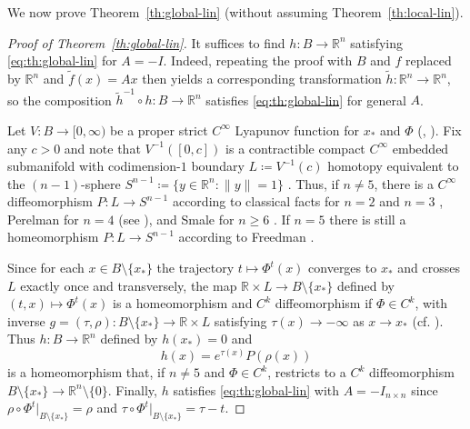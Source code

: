 \documentclass[11pt]{amsart}
\newcommand{\R}{\mathbb{R}}
\theoremstyle{definition}
\begin{document}
We now prove Theorem~\ref{th:global-lin} (without assuming Theorem~\ref{th:local-lin}).

\begin{proof}[Proof of Theorem~\ref{th:global-lin}]
It suffices to find $h\colon B\to \R^n$ satisfying \eqref{eq:th:global-lin} for $A=-I$.
Indeed, repeating the proof with $B$ and $f$ replaced by $\R^n$ and $\tilde{f}(x)=Ax$ then yields a corresponding transformation $\tilde{h}\colon \R^n\to \R^n$, so the composition $\tilde{h}^{-1}\circ h\colon B\to \R^n$  satisfies \eqref{eq:th:global-lin} for general $A$.

Let  $V\colon B\to [0,\infty)$ be a proper strict $C^\infty$ Lyapunov function for $x_*$ and $\Phi$ (\cite[Thm~3.2]{wilson1969smooth}, \cite[Sec.~6]{fathi2019smoothing}).
Fix any $c>0$ and note that $V^{-1}([0,c])$ is a contractible compact $C^\infty$ embedded submanifold with codimension-$1$ boundary $L\coloneqq V^{-1}(c)$ homotopy equivalent to the $(n-1)$-sphere $S^{n-1}\coloneqq \{y\in \R^n\colon \|y\|=1\}$ \cite[pp.~326--327]{wilson1967structure}.
Thus, if $n\neq 5$, there is a $C^\infty$ diffeomorphism $P\colon L\to S^{n-1}$ according to classical facts for $n=2$ \cite[Appendix]{milnor1997topology} and $n=3$  \cite[Thm~9.3.11]{hirsch1994differential}, Perelman for $n=4$ \cite{perelman2002entropy,perelman2003ricci,perelman2003finite} (see \cite[Cor.~0.2]{morgan2007ricci}), and Smale for $n\geq 6$ \cite[Thm~5.1]{smale1962structure}.
If $n=5$ there is still a homeomorphism $P\colon L\to S^{n-1}$ according to Freedman \cite[Thm~1.6]{freedman1982topology}.

Since for each $x\in B\setminus \{x_*\}$ the trajectory $t\mapsto \Phi^t(x)$  converges to $x_*$ and crosses $L$ exactly once and transversely, the map $\R\times L\to B \setminus \{x_*\}$ defined by $(t,x)\mapsto \Phi^t(x)$ is a homeomorphism and $C^k$ diffeomorphism if $\Phi\in C^k$, with inverse $g=(\tau,\rho)\colon B\setminus \{x_*\}\to \R\times L$ satisfying $\tau(x)\to -\infty$ as $x\to x_*$ (cf. \cite[p.~327]{wilson1967structure}).
Thus $h\colon B\to \R^n$ defined by $h(x_*)=0$ and
\begin{equation*}
	h(x)=e^{\tau(x)}P( \rho(x))
\end{equation*}
is a homeomorphism that, if $n\neq 5$ and $\Phi\in C^k$, restricts to a $C^k$ diffeomorphism $B\setminus \{x_*\}\to \R^n\setminus \{0\}$. 
Finally, $h$ satisfies \eqref{eq:th:global-lin} with $A=-I_{n\times n}$ since $\rho\circ \Phi^t|_{B\setminus \{x_*\}}=\rho$ and $\tau \circ \Phi^t|_{B\setminus \{x_*\}}=\tau - t$.
\end{proof}
\end{document}
